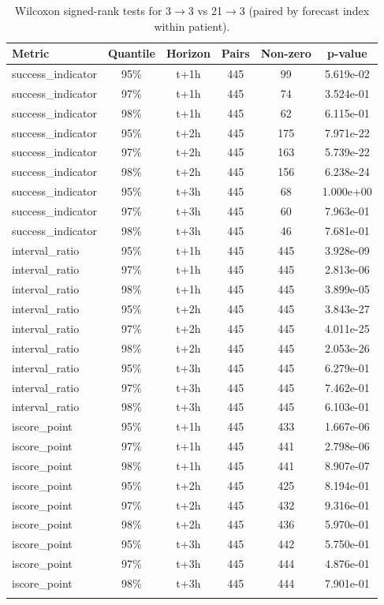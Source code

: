 \begin{table}[h]
\caption{Wilcoxon signed-rank tests for 3$\rightarrow$3 vs 21$\rightarrow$3 (paired by forecast index within patient).}\label{tab:wilcoxon_3v21}
\begin{tabular}{@{}lccccc@{}}
\toprule
Metric & Quantile & Horizon & Pairs & Non-zero & p-value \\
\midrule
success_indicator & 95\% & t+1h & 445 & 99 & 5.619e-02 \\
success_indicator & 97\% & t+1h & 445 & 74 & 3.524e-01 \\
success_indicator & 98\% & t+1h & 445 & 62 & 6.115e-01 \\
success_indicator & 95\% & t+2h & 445 & 175 & 7.971e-22 \\
success_indicator & 97\% & t+2h & 445 & 163 & 5.739e-22 \\
success_indicator & 98\% & t+2h & 445 & 156 & 6.238e-24 \\
success_indicator & 95\% & t+3h & 445 & 68 & 1.000e+00 \\
success_indicator & 97\% & t+3h & 445 & 60 & 7.963e-01 \\
success_indicator & 98\% & t+3h & 445 & 46 & 7.681e-01 \\
interval_ratio & 95\% & t+1h & 445 & 445 & 3.928e-09 \\
interval_ratio & 97\% & t+1h & 445 & 445 & 2.813e-06 \\
interval_ratio & 98\% & t+1h & 445 & 445 & 3.899e-05 \\
interval_ratio & 95\% & t+2h & 445 & 445 & 3.843e-27 \\
interval_ratio & 97\% & t+2h & 445 & 445 & 4.011e-25 \\
interval_ratio & 98\% & t+2h & 445 & 445 & 2.053e-26 \\
interval_ratio & 95\% & t+3h & 445 & 445 & 6.279e-01 \\
interval_ratio & 97\% & t+3h & 445 & 445 & 7.462e-01 \\
interval_ratio & 98\% & t+3h & 445 & 445 & 6.103e-01 \\
iscore_point & 95\% & t+1h & 445 & 433 & 1.667e-06 \\
iscore_point & 97\% & t+1h & 445 & 441 & 2.798e-06 \\
iscore_point & 98\% & t+1h & 445 & 441 & 8.907e-07 \\
iscore_point & 95\% & t+2h & 445 & 425 & 8.194e-01 \\
iscore_point & 97\% & t+2h & 445 & 432 & 9.316e-01 \\
iscore_point & 98\% & t+2h & 445 & 436 & 5.970e-01 \\
iscore_point & 95\% & t+3h & 445 & 442 & 5.750e-01 \\
iscore_point & 97\% & t+3h & 445 & 444 & 4.876e-01 \\
iscore_point & 98\% & t+3h & 445 & 444 & 7.901e-01 \\
\botrule
\end{tabular}
\end{table}
